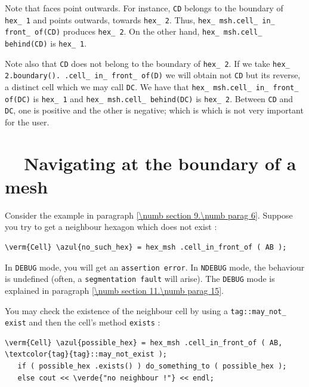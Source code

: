 Note that faces point outwards.
For instance, {\small\tt CD} belongs to the boundary of {\small\tt hex\_\,1} and points
outwards, towards {\small\tt hex\_\,2}.
Thus, {\small\tt hex\_\,msh.cell\_\,in\_\,front\_\,of(CD)} produces {\small\tt hex\_\,2}.
On the other hand, {\small\tt hex\_\,msh.cell\_\,behind(CD)} is {\small\tt hex\_\,1}.

Note also that {\small\tt CD} does not belong to the boundary of {\small\tt hex\_\,2}.
If we take {\small\tt hex\_\,2.boundary(). .cell\_\,in\_\,front\_\,of(D)} we will obtain not
{\small\tt CD} but its reverse, a distinct cell which we may call {\small\tt DC}.
We have that {\small\tt hex\_\,msh.cell\_\,in\_\,front\_\,of(DC)} is {\small\tt hex\_\,1} and
{\small\tt hex\_\,msh.cell\_\,behind(DC)} is {\small\tt hex\_\,2}.
Between {\small\tt CD} and {\small\tt DC}, one is positive and the other is negative;
which is which is not very important for the user.


\section{~~Navigating at the boundary of a mesh}\label{\numb section 9.\numb parag 7}

Consider the example in paragraph \ref{\numb section 9.\numb parag 6}.
Suppose you try to get a neighbour hexagon which does not exist :

\begin{Verbatim}[commandchars=\\\{\},formatcom=\small\tt,
   baselinestretch=0.94,framesep=2mm                      ]
   \verm{Cell} \azul{no_such_hex} = hex_msh .cell_in_front_of ( AB );
\end{Verbatim}

In {\small\tt DEBUG} mode, you will get an {\small\tt assertion error}.
In {\small\tt NDEBUG} mode, the behaviour is undefined
(often, a {\small\tt segmentation fault} will arise).
The {\small\tt DEBUG} mode is explained in paragraph \ref{\numb section 11.\numb parag 15}.

You may check the existence of the neighbour cell by using a
{\small\tt \textcolor{tag}{tag}::may\_\;not\_\,exist} and then the cell's method {\small\tt exists} :

\begin{Verbatim}[commandchars=\\\{\},formatcom=\small\tt,
   baselinestretch=0.94,framesep=2mm                      ]
   \verm{Cell} \azul{possible_hex} = hex_msh .cell_in_front_of ( AB, \textcolor{tag}{tag}::may_not_exist );
   if ( possible_hex .exists() ) do_something_to ( possible_hex );
   else cout << \verde{"no neighbour !"} << endl;
\end{Verbatim}

